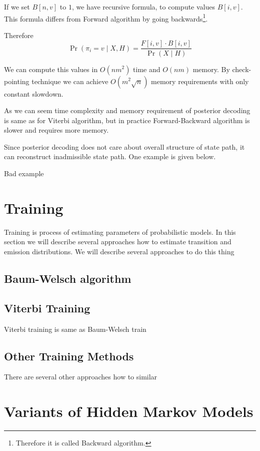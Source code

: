If we set $B[n,v]$ to $1$, we have recursive formula, to compute values
$B[i,v]$. This formula differs from Forward algorithm by going
backwards\footnote{Therefore it is called Backward algorithm.}.


Therefore \[\Pr\left(\pi_i=v\mid X,H\right) = \frac{F[i,v]\cdot
B[i,v]}{\Pr\left( X\mid H \right)}\]

We can compute this values in $O(nm^2)$ time and $O(nm)$ memory. By
check-pointing technique we can achieve $O(m^2\sqrt{n})$ memory requirements
with only constant slowdown.

As we can seem time complexity and memory requirement of posterior decoding is
same as for Viterbi algorithm, but in practice Forward-Backward algorithm is
slower and requires more memory.

Since posterior decoding does not care about overall structure of state path, it
can reconstruct inadmissible state path. One example is given below.
\begin{example}
Bad example
\end{example}

\section{Training} 

Training is process of estimating parameters of probabilistic models. In this
section we will describe several approaches how to estimate transition and
emission distributions. We will describe several approaches to do this thing

\subsection{Baum-Welsch algorithm}
\subsection{Viterbi Training}

Viterbi training is same as Baum-Welsch train

\subsection{Other Training Methods}
There are several other approaches how to similar
\section{Variants of Hidden Markov Models}

